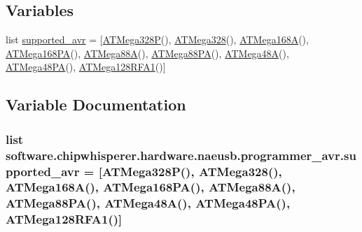 \subsection*{Variables}
\begin{DoxyCompactItemize}
\item 
list \hyperlink{namespacesoftware_1_1chipwhisperer_1_1hardware_1_1naeusb_1_1programmer__avr_abc59a36e287ea77d34b4abd52470f926}{supported\+\_\+avr} = \mbox{[}\hyperlink{classsoftware_1_1chipwhisperer_1_1hardware_1_1naeusb_1_1programmer__avr_1_1ATMega328P}{A\+T\+Mega328\+P}(), \hyperlink{classsoftware_1_1chipwhisperer_1_1hardware_1_1naeusb_1_1programmer__avr_1_1ATMega328}{A\+T\+Mega328}(), \hyperlink{classsoftware_1_1chipwhisperer_1_1hardware_1_1naeusb_1_1programmer__avr_1_1ATMega168A}{A\+T\+Mega168\+A}(), \hyperlink{classsoftware_1_1chipwhisperer_1_1hardware_1_1naeusb_1_1programmer__avr_1_1ATMega168PA}{A\+T\+Mega168\+P\+A}(), \hyperlink{classsoftware_1_1chipwhisperer_1_1hardware_1_1naeusb_1_1programmer__avr_1_1ATMega88A}{A\+T\+Mega88\+A}(), \hyperlink{classsoftware_1_1chipwhisperer_1_1hardware_1_1naeusb_1_1programmer__avr_1_1ATMega88PA}{A\+T\+Mega88\+P\+A}(), \hyperlink{classsoftware_1_1chipwhisperer_1_1hardware_1_1naeusb_1_1programmer__avr_1_1ATMega48A}{A\+T\+Mega48\+A}(), \hyperlink{classsoftware_1_1chipwhisperer_1_1hardware_1_1naeusb_1_1programmer__avr_1_1ATMega48PA}{A\+T\+Mega48\+P\+A}(), \hyperlink{classsoftware_1_1chipwhisperer_1_1hardware_1_1naeusb_1_1programmer__avr_1_1ATMega128RFA1}{A\+T\+Mega128\+R\+F\+A1}()\mbox{]}
\end{DoxyCompactItemize}


\subsection{Variable Documentation}
\hypertarget{namespacesoftware_1_1chipwhisperer_1_1hardware_1_1naeusb_1_1programmer__avr_abc59a36e287ea77d34b4abd52470f926}{}
\subsubsection[{supported\+\_\+avr}]{\setlength{\rightskip}{0pt plus 5cm}list software.\+chipwhisperer.\+hardware.\+naeusb.\+programmer\+\_\+avr.\+supported\+\_\+avr = \mbox{[}{\bf A\+T\+Mega328\+P}(), {\bf A\+T\+Mega328}(), {\bf A\+T\+Mega168\+A}(), {\bf A\+T\+Mega168\+P\+A}(), {\bf A\+T\+Mega88\+A}(), {\bf A\+T\+Mega88\+P\+A}(), {\bf A\+T\+Mega48\+A}(), {\bf A\+T\+Mega48\+P\+A}(), {\bf A\+T\+Mega128\+R\+F\+A1}()\mbox{]}}\label{namespacesoftware_1_1chipwhisperer_1_1hardware_1_1naeusb_1_1programmer__avr_abc59a36e287ea77d34b4abd52470f926}
